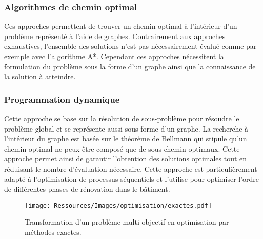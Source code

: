 \subsubsection{Algorithmes de chemin optimal} %
\label{ssub:algorithmes_de_chemin_optimal}
Ces approches permettent de trouver un chemin optimal à l’intérieur d’un problème
représenté à l’aide de graphes. Contrairement aux approches exhaustives, l’ensemble
des solutions n’est pas nécessairement évalué comme par exemple avec l’algorithme
A*. Cependant ces approches nécessitent la formulation du problème sous la forme d’un
graphe ainsi que la connaissance de la solution à atteindre.


\subsubsection{Programmation dynamique} %
\label{ssub:programmation_dynamique}
Cette approche se base sur la résolution de sous-problème pour résoudre le problème global
et se représente aussi sous forme d’un graphe. La recherche à l’intérieur du graphe est basée
sur le théorème de Bellmann qui stipule qu’un chemin optimal ne peux être composé
que de sous-chemin optimaux. Cette approche permet ainsi de garantir l’obtention
des solutions optimales tout en réduisant le nombre d’évaluation nécessaire.
Cette approche est particulièrement adapté à l’optimisation de processus séquentiels
et \cite{Rivallain2013} l’utilise pour optimiser l’ordre de différentes phases
de rénovation dans le bâtiment.

\begin{figure}
    \begin{center}
        \texttt{[image: Ressources/Images/optimisation/exactes.pdf]}
    \end{center}
    \caption{Transformation d’un problème multi-objectif en optimisation par méthodes
             exactes.
             \label{fig:multi_exactes}}
\end{figure}



